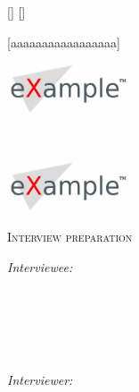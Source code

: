 [\interviewerfname]
[\intervieweefname]

[aaaaaaaaaaaaaaaaa]


{
\center

\begin{minipage}{0.45\textwidth}
\begin{flushleft}

  \includegraphics[height=1.5cm]{interview/org.png}


\end{flushleft}
\end{minipage}
~
\begin{minipage}{0.45\textwidth}
\begin{flushright}

  \includegraphics[height=1.5cm]{interview/org.png}


\end{flushright}
\end{minipage}

\vspace{1cm}

\textsc{\Large Interview preparation} \\

\vspace{1cm}

\begin{minipage}{0.4\textwidth}
\begin{flushleft} \small
{\Large\emph{Interviewee:}}\\[0.25cm]

\intervieweefname~\textsc{\intervieweename}\\ 
\intervieweeorg\\ 
\href{mailto:\intervieweeemail}{\intervieweeemail}\\

\end{flushleft}
\end{minipage}
~
\begin{minipage}{0.4\textwidth}
\begin{flushright} \small

{\Large\emph{Interviewer:}}\\[0.25cm]

\interviewerfname~\textsc{\interviewername}\\ 
\interviewerorg\\
\href{mailto:\intervieweremail}{\intervieweremail}\\

\end{flushright}
\end{minipage}
\\
}

